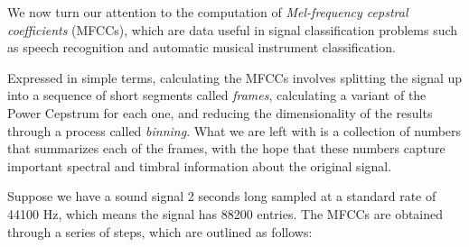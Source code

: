 We now turn our attention to the computation of \emph{Mel-frequency cepstral coefficients} (MFCCs), which
are data useful in signal classification problems such as speech recognition and automatic musical instrument classification.

Expressed in simple terms, calculating the MFCCs involves splitting the signal up into a sequence of
short segments called \emph{frames}, calculating a variant of the Power Cepstrum for each one,
and reducing the dimensionality of the results through a process called \emph{binning}.
What we are left with is a collection of numbers that summarizes each of the frames, with the hope that these
numbers capture important spectral and timbral information about the original signal.

Suppose we have a sound signal 2 seconds long sampled at a standard rate of 44100 Hz, which means the
signal has 88200 entries.
The  MFCCs are obtained through a series of steps, which are outlined
as follows:

